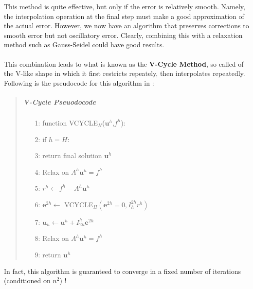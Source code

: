 This method is quite effective, but only if the error is relatively smooth. Namely, the interpolation operation at the final step must make a good approximation of the actual error. However, we now have an algorithm that preserves corrections to smooth error but not oscillatory error. Clearly, combining this with a relaxation method such as Gauss-Seidel could have good results.
\\\\
This combination leads to what is known as the \textbf{V-Cycle Method}, so called of the V-like shape in which it first restricts repeately, then interpolates repeatedly. Following is the pseudocode for this algorithm in \cite{lee14}:
\vspace{-.2in}
\begin{quote}
\item
\subparagraph{V-Cycle Pseuodocode}
\begin{enumerate}
\item[1:] function VCYCLE$_H$($\textbf{u}^h$,$f^h$):
\item[2:] \hspace{.2in} if $h=H$:
\item[3:] \hspace{.4in} return final solution $\textbf{u}^h$
\item[4:] \hspace{.2in} Relax on $A^h\textbf{u}^h=f^h$
\item[5:] \hspace{.2in} $r^{h}\leftarrow f^h-
						A^h\textbf{u}^h$
\item[6:] \hspace{.2in} $\textbf{e}^{2h}\leftarrow$
						VCYCLE$_H(\textbf{e}^{2h}=0,
						I_h^{2h}r^h)$
\item[7:] \hspace{.2in} $\textbf{u}_h\leftarrow
						\textbf{u}^h+I_{2h}^h
						\textbf{e}^{2h}$
\item[8:] \hspace{.2in} Relax on $A^h\textbf{u}^h=f^h$
\item[9:] \hspace{.2in} return $\textbf{u}^h$
\end{enumerate}
\end{quote}
In fact, this algorithm is guaranteed to converge in a fixed number of iterations (conditioned on $n^2$) \cite{gopal08}!